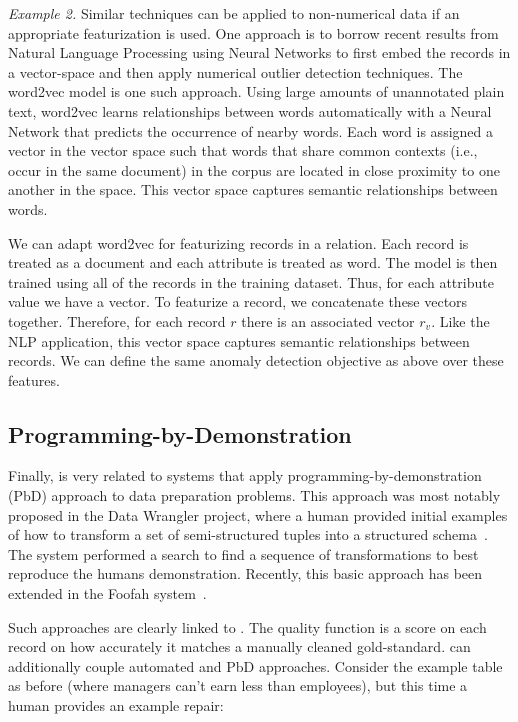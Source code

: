 \vspace{0.5em}

\vspace{0.5em} \noindent \emph{Example 2.} Similar techniques can be applied to non-numerical data if an appropriate featurization is used.
One approach is to borrow recent results from Natural Language Processing using Neural Networks to first embed the records in a vector-space and then apply numerical outlier detection techniques. The \textsf{word2vec} model \cite{mikolov2013distributed} is one such approach.
Using large amounts of unannotated plain text, \textsf{word2vec} learns relationships between words automatically with a Neural Network that predicts the occurrence of nearby words.
 Each word is assigned a vector in the vector space such that words that share common contexts (i.e., occur in the same document) in the corpus are located in close proximity to one another in the space.
 This vector space captures semantic relationships between words.
 
 We can adapt \textsf{word2vec} for featurizing records in a relation. Each record is treated as a document and each attribute is treated as word.
 The model is then trained using all of the records in the training dataset.
 Thus, for each attribute value we have a vector.
 To featurize a record, we concatenate these vectors together.
 Therefore, for each record $r$ there is an associated vector $r_v$.
  Like the NLP application, this vector space captures semantic relationships between records.
  We can define the same anomaly detection objective as above over these features.
  
\subsection{Programming-by-Demonstration}
Finally, \sys is very related to systems that apply programming-by-demonstration (PbD) approach to data preparation problems.
This approach was most notably proposed in the Data Wrangler project, where a human provided initial examples of how to transform a set of semi-structured tuples into a structured schema~\cite{wrangler,trifacta}.
The system performed a search to find a sequence of transformations to best reproduce the humans demonstration.
Recently, this basic approach has been extended in the Foofah system~\cite{jin2017foofah}.

Such approaches are clearly linked to \sys. The quality function is a score on each record on how accurately it matches a manually cleaned gold-standard. \sys can additionally couple automated and PbD approaches. 
Consider the example table as before (where managers can't earn less than employees), but this time  a human provides an example repair: 

